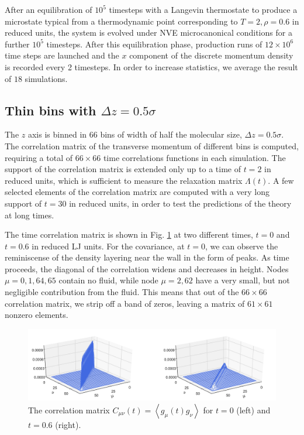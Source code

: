 \documentclass[b5paper,openright,10pt]{book}
\newcommand{\llangle}{\left\langle}
\newcommand{\rrangle}{\right\rangle}
\begin{document}
After an equilibration of $10^5$ timesteps with a Langevin thermostate
to   produce  a   microstate  typical   from  a   thermodynamic  point
corresponding  to  $T=2,\rho=0.6$ in  reduced  units,  the system  is
evolved  under  NVE microcanonical  conditions  for  a further  $10^5$
timesteps.   After  this  equilibration   phase,  production  runs  of
$12\times 10^6$ time  steps are launched and the $x$  component of the
discrete momentum density is recorded  every 2 timesteps.  In order to
increase statistics, we average the result of $18$ simulations.


\subsection{Thin bins with $\Delta z = 0.5\sigma$}
\label{Sec:ThinBins}
The $z$  axis is binned  in $66$ bins of  width of half  the molecular
size, $\Delta z=0.5\sigma$.  The  correlation matrix of the transverse
momentum of different bins is computed, requiring a total of $66\times
66$ time correlations  functions  in each  simulation.   
The support of  the correlation matrix  is extended only  up to a  time of
$t=2$ in reduced units, which  is sufficient to measure the relaxation
matrix $\Lambda(t)$.   A  few  selected  elements of  the  correlation  matrix  are
computed with a very long support of $t=30$ in reduced units, in order
to test the predictions of the theory at long times.

The     time    correlation     matrix     is     shown    in     Fig.
\ref{fig:Ct-matrix-WALLS-66nodes}  at two  different times,  $t=0$ and
$t=0.6$ in  reduced LJ units.   For the  covariance, at $t=0$,  we can
observe the reminiscense of the density  layering near the wall in the
form  of peaks.   As time  proceeds, the  diagonal of  the correlation
widens  and decreases  in  height.  Nodes  $\mu=0,1,64,65$ contain  no
fluid,  while  node  $\mu=2,62$  have   a  very  small,  but  not
  negligible contribution  from the  fluid.
This means that  out of the $66\times66$ correlation  matrix, we strip
off  a  band  of  zeros,  leaving a  matrix  of  $61\times61$  nonzero
elements.

\begin{figure}[h!]
\centering
\includegraphics[width=\linewidth]{Ct-matrix-WALLS-66nodes}
\caption[Correlation matrix $C(t)$ at $t=0$ and $t=0.6$ for a confined fluid - Thin bins]{The   correlation    matrix   $C_{\mu\nu}(t)=\llangle
g_{\mu}(t)  g_\nu\rrangle$ for  $t=0$ (left) and $t=0.6$ (right).}
\label{fig:Ct-matrix-WALLS-66nodes}
\end{figure}
\end{document}
